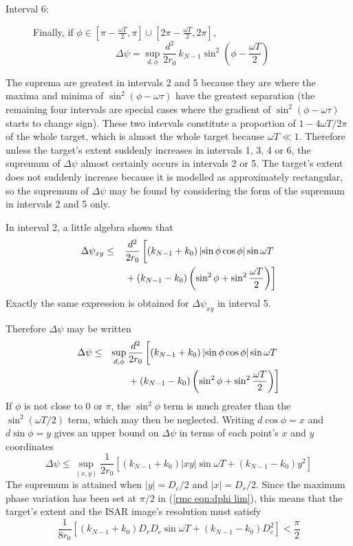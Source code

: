 \begin{description}
\item[Interval 6:]
Finally, if $\phi\in[\pi-\frac{\omega T}{2},\pi]\cup
[2\pi-\frac{\omega T}{2},2\pi]$,
\begin{equation}
\Delta\psi=\sup_{d,\phi}\frac{d^2}{2r_0}
\,k_{N-1}\sin^2\left(\phi-\frac{\omega T}{2}\right)
\end{equation}
\end{description}

The suprema are greatest in intervals 2 and 5 because they are where the
maxima and minima of $\sin^2(\phi-\omega\tau)$ have the greatest separation
(the remaining four intervals are special cases where the gradient of
$\sin^2(\phi-\omega\tau)$ starts to change sign).  These two intervals
constitute a proportion of $1-4\omega T/2\pi$ of the whole target, which is
almost the whole target because $\omega T\ll 1$.  Therefore unless the
target's extent suddenly increases in intervals 1, 3, 4 or 6, the supremum
of $\Delta\psi$ almost certainly occurs in intervals 2 or 5.  The target's
extent does not suddenly increase because it is modelled as approximately
rectangular, so the supremum of $\Delta\psi$ may be found by considering the
form of the supremum in intervals 2 and 5 only.

In interval 2, a little algebra shows that
\begin{eqnarray}
\Delta\psi_{xy}&\leq&\frac{d^2}{2r_0}\left[\vphantom{\frac{1}{2}}
(k_{N-1}+k_0)\left|\sin\phi\cos\phi\right|\sin\omega T\right. 		\nn\\
&&\left.\mbox{}+(k_{N-1}-k_0)\left(\sin^2\phi+\sin^2\frac{\omega T}{2}\right)
\right]
\end{eqnarray}
Exactly the same expression is obtained for $\Delta\psi_{xy}$ in interval 5.

Therefore $\Delta\psi$ may be written
\begin{eqnarray}
\Delta\psi&\leq&\sup_{d,\phi}\frac{d^2}{2r_0}\left[\vphantom{\frac{1}{2}}
(k_{N-1}+k_0)\left|\sin\phi\cos\phi\right|\sin\omega T\right.		\nn\\
&&\left.\mbox{}+(k_{N-1}-k_0)\left(\sin^2\phi+\sin^2\frac{\omega T}{2}\right)
\right]
\end{eqnarray}
If $\phi$ is not close to $0$ or $\pi$, the $\sin^2\phi$ term is much
greater than the $\sin^2(\omega T/2)$ term, which may then be neglected.
Writing $d\cos\phi=x$ and $d\sin\phi=y$ gives an upper bound on $\Delta\psi$
in terms of each point's $x$ and $y$ coordinates
\begin{equation}
\Delta\psi\leq\sup_{(x,y)}\frac{1}{2r_0}\left[
(k_{N-1}+k_0)\left|xy\right|\sin\omega T+(k_{N-1}-k_0)y^2\right]
\end{equation}
The supremum is attained when $\left|y\right|=D_c/2$ and
$\left|x\right|=D_r/2$.  Since the maximum phase variation has been set at
$\pi/2$ in (\ref{rmc eqn:dphi lim}), this means that the target's extent and
the ISAR image's resolution must satisfy
\begin{equation}\label{rmc eqn:rd const}
\frac{1}{8r_0}\left[(k_{N-1}+k_0)D_rD_c\sin\omega T+
(k_{N-1}-k_0)D_c^2\right]<\frac{\pi}{2}
\end{equation}

